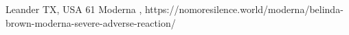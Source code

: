           {Leander TX, USA}
          {61}
          {Moderna}
          {, }
          {
          }
          {https://nomoresilence.world/moderna/belinda-brown-moderna-severe-adverse-reaction/}
